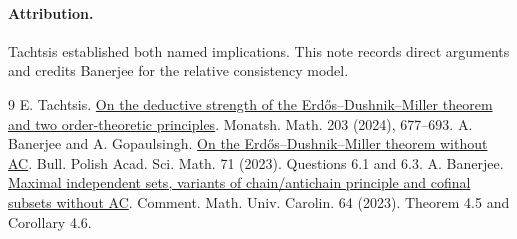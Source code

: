 \documentclass[11pt]{article}
\begin{document}
\paragraph{Attribution.} Tachtsis \cite{t24} established both named implications. This note records direct arguments and credits Banerjee for the relative consistency model.
\begin{thebibliography}{9}
 E. Tachtsis. \href{https://doi.org/10.1007/s00605-023-01933-z}{On the deductive strength of the Erdős--Dushnik--Miller theorem and two order-theoretic principles}. Monatsh. Math. 203 (2024), 677--693.
 A. Banerjee and A. Gopaulsingh. \href{https://doi.org/10.4064/ba221221-6-6}{On the Erdős--Dushnik--Miller theorem without AC}. Bull. Polish Acad. Sci. Math. 71 (2023). Questions 6.1 and 6.3.
 A. Banerjee. \href{https://dml.cz/handle/10338.dmlcz/151857}{Maximal independent sets, variants of chain/antichain principle and cofinal subsets without AC}. Comment. Math. Univ. Carolin. 64 (2023). Theorem 4.5 and Corollary 4.6.
\end{thebibliography}
\end{document}
